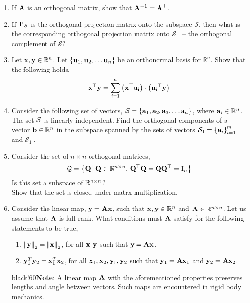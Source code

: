 \documentclass[
10pt, %
a4paper, %
oneside, %
headinclude,footinclude, %
BCOR5mm, %
]{scrartcl}
\def\mf{\ensuremath\mathbf}
\def\mb{\ensuremath\mathbb}
\begin{document}
\begin{enumerate}
	\item If $\mf{A}$ is an orthogonal matrix, show that $\mf{A}^{-1} = \mf{A}^\top$.
	
	\item If $\mf{P}_{\mathcal{S}}$ is the orthogonal projection matrix onto the subspace $\mathcal{S}$, then what is the corresponding orthogonal projection matrix onto $\mathcal{S}^{\perp}$ -- the orthogonal complement of $\mathcal{S}$?
	
	\item Let $\mf{x}, \mf{y} \in \mathbb{R}^n$. Let $\cc{\mf{u}_1, \mf{u}_2, \ldots \mf{u}_n}$ be an orthonormal basis for $\mathbb{R}^n$. Show that the following holds,
	\[ \mf{x}^\top\mf{y} = \sum_{i=1}^n \pp{\mf{x}^\top \mf{u_i}} \cdot \pp{\mf{u_i}^\top \mf{y}} \]
	
	\item Consider the following set of vectors, $\mathcal{S} = \left\{ \mf{a}_1, \mf{a}_2, \mf{a}_3, \ldots \mf{a}_n \right\}$, where $\mf{a}_i \in \mathbb{R}^n$. The set $\mathcal{S}$ is linearly independent. Find the orthogonal components of a vector $\mf{b} \in \mathbb{R}^n$ in the subspace spanned by the sets of vectors $\mathcal{S}_1 = \left\{ \mf{a}_i \right\}_{i=1}^m$ and $\mathcal{S}_1^\perp$.
	
	\item Consider the set of $n \times n$ orthogonal matrices,
	\[ \mc{Q} = \left\{ \mf{Q} \, \big \vert \, \mf{Q} \in \mb{R}^{n \times n}, \, \mf{Q}^\top\mf{Q} = \mf{Q}\mf{Q}^\top = \mf{I}_n  \right\} \] 
	Is this set a subspace of $\mb{R}^{n \times n}$? \\
	Show that the set is closed under matrx multiplication.
	
    \item Consider the linear map, $\mf{y} = \mf{Ax}$, such that $\mf{x}, \mf{y} \in \mb{R}^n$ and $\mf{A} \in \mb{R}^{n \times n}$. Let us assume that $\mf{A}$ is full rank. What conditions must $\mf{A}$ satisfy for the following statements to be true,
    \begin{enumerate}
        \item $\left\lVert \mf{y}\right\rVert_2 = \left\lVert \mf{x}\right\rVert_2$, for all $\mf{x}, \mf{y}$ such that $\mf{y} = \mf{Ax}$.
        \item $\mf{y}_1^T\mf{y}_2 = \mf{x}_1^T\mf{x}_2$, for all $\mf{x}_1, \mf{x}_2, \mf{y}_1, \mf{y}_2$ such that $\mf{y}_1 = \mf{A}\mf{x}_1$ and $\mf{y}_2 = \mf{A}\mf{x}_2$. 
    \end{enumerate}
    \vspace{-0.1cm}
    \begin{color}{black!60}\small{\textbf{Note}: A linear map $\mf{A}$ with the aforementioned properties preserves lengths and angle between vectors. Such maps are encountered in rigid body mechanics.}
    \end{color}
\end{enumerate}
\end{document}
